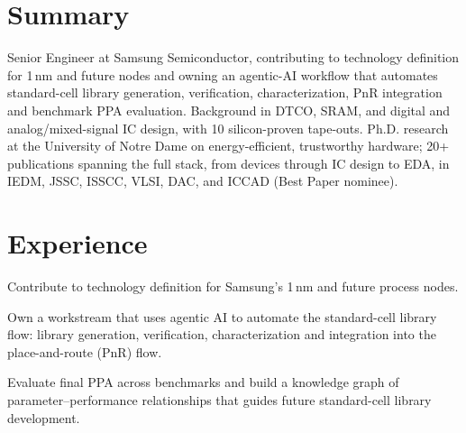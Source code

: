 \documentclass[10pt,letterpaper]{article}
\begin{document}

\section{Summary}
{\small Senior Engineer at Samsung Semiconductor, contributing to technology definition for 1\,nm and future nodes and
owning an agentic-AI workflow that automates standard-cell library generation, verification, characterization,
PnR integration and benchmark PPA evaluation. Background in DTCO, SRAM, and digital and analog/mixed-signal IC
design, with 10 silicon-proven tape-outs. Ph.D. research at the University of Notre Dame on energy-efficient,
trustworthy hardware; 20+ publications spanning the full stack, from devices through IC design to EDA, in IEDM,
JSSC, ISSCC, VLSI, DAC, and ICCAD (Best Paper nominee).\par}

\section{Experience}

\begin{bullets}
  \item Contribute to technology definition for Samsung's 1\,nm and future process nodes.
  \item Own a workstream that uses agentic AI to automate the standard-cell library flow: library generation,
        verification, characterization and integration into the place-and-route (PnR) flow.
  \item Evaluate final PPA across benchmarks and build a knowledge graph of parameter--performance relationships
        that guides future standard-cell library development.
\end{bullets}
\end{document}
